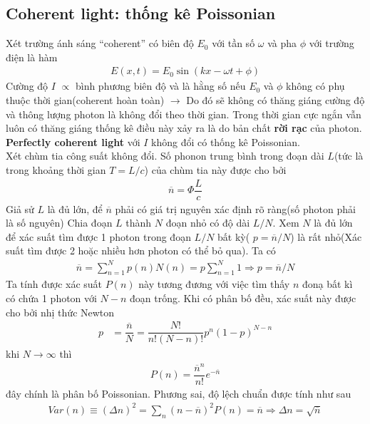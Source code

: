 \documentclass{report}
\newcommand{\f}[2]{\dfrac{#1}{#2}}
\begin{document}
\subsection{Coherent light: thống kê Poissonian}
Xét trường ánh sáng ``coherent'' có biên độ $E_{0}$ với tần số $\omega$ và pha $\phi$ với trường điện là hàm
\begin{gather}
	E(x,t) = E_{0} \sin(kx - \omega t + \phi)
\end{gather}
Cường độ $I$ $\propto$ bình phương biên độ và là hằng số nếu $E_0$ và $\phi$ không có phụ thuộc thời gian(coherent hoàn toàn) $\rightarrow$ Do đó sẽ không có thăng giáng cường độ và thông lượng photon là không đổi theo thời gian. Trong thời gian cực ngắn vẫn luôn có thăng giáng thống kê điều này xảy ra là do bản chất \textbf{rời rạc} của photon. \\
\textbf{Perfectly coherent light} với $I$ không đổi có thống kê Poissonian.\\
Xét chùm tia công suất không đổi. Số phonon trung bình trong đoạn dài $L$(tức là trong khoảng thời gian $T = L / c$) của chùm tia này được cho bởi
\begin{gather}
	\overline{n} = \Phi \f{L}{c}
\end{gather}
Giả sử $L$ là đủ lớn, để $\overline{n}$ phải có giá trị nguyên xác định rõ ràng(số photon phải là số nguyên) Chia đoạn $L$ thành $N$ đoạn nhỏ có độ dài $L/N$. Xem $N$ là đủ lớn để xác suất tìm được 1 photon trong đoạn $L/N$ bất kỳ( $p = \overline{n} / N$) là rất nhỏ(Xác suất tìm được 2 hoặc nhiều hơn photon có thể bỏ qua). Ta có
\begin{gather}
	\overline{n} = \sum_{n = 1}^{N} p(n) N(n) = p \sum_{n = 1}^{N} 1  \Rightarrow p = \overline{n} / N
\end{gather}
Ta tính được xác suất $P(n)$ này tương đương với việc tìm thấy $n$ đonạ bất kì có chứa 1 photon với $N - n$ đoạn trống. Khi có phân bố đều, xác suất này được cho bởi nhị thức Newton
\begin{equation}
	\begin{aligned}
		p
		 & = \f{\overline{n}}{N}     
		 = \f{N!}{n!(N-n)!} p^{n} (1 - p)^{N-n}
	\end{aligned}
\end{equation}
khi $N\rightarrow \infty$ thì
\begin{gather}
	P(n) = \f{\overline{n}^{n}}{n!} e^{- \overline{n}}
\end{gather}
đây chính là phân bố Poissonian. Phương sai, độ lệch chuẩn được tính như sau
\begin{gather}
	Var(n) \equiv (\Delta n)^{2} = \sum_{n} (n - \overline{n})^{2} P(n) = \overline{n} \Rightarrow \Delta n = \sqrt{\overline{n}}
\end{gather}
\end{document}
